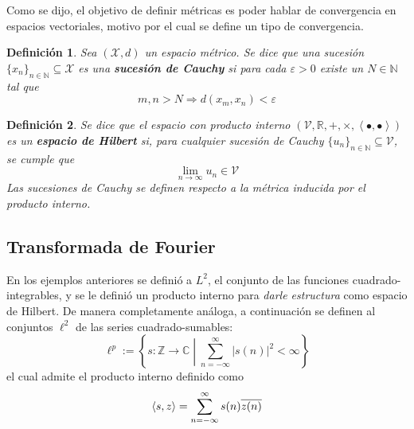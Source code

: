 \documentclass[12pt,letterpaper]{book}
\newtheorem{definicion}{Definición}[chapter]
\newcommand{\R}{\mathbb{R}}
\newcommand{\C}{\mathbb{C}}
\newcommand{\N}{\mathbb{N}}
\newcommand{\Z}{\mathbb{Z}}
\newcommand{\abso}[1]{\left| #1 \right|}
\newcommand{\producto}[1]{\left\langle #1 \right\rangle}
\newcommand{\talque}{\mathrel{}\middle|\mathrel{}}
\begin{document}
Como se dijo, el objetivo de definir métricas es poder hablar de convergencia en espacios vectoriales, motivo por el cual se define un tipo de convergencia.

\begin{definicion}
Sea $(\mathcal{X},d)$ un espacio métrico. Se dice que una sucesión $\{x_n\}_{n\in \N} \subseteq \mathcal{X}$ es una \textbf{sucesión de Cauchy} si para cada $\varepsilon > 0$ existe un $N \in \N$ tal que
\begin{equation}
m, n > N \Rightarrow d(x_m, x_n) < \varepsilon
\end{equation}
\end{definicion}

\begin{definicion}
Se dice que el espacio con producto interno $(\mathcal{V},\R,+,\times, \producto{\bullet,\bullet})$ es un \textbf{espacio de Hilbert} si, para cualquier sucesión de Cauchy $\{u_n\}_{n\in \N} \subseteq \mathcal{V}$, se cumple que
\begin{equation}
\lim_{n\rightarrow\infty} u_n \in \mathcal{V}
\end{equation}
Las sucesiones de Cauchy se definen respecto a la métrica inducida por el producto interno.
\end{definicion}


\subsection{Transformada de Fourier}
\label{sec:fourier1}

En los ejemplos anteriores se definió a $L^{2}$, el conjunto de las funciones cuadrado-integrables, y se le definió un producto interno para \textit{darle estructura} como espacio de Hilbert.
%
De manera completamente análoga, a continuación se definen al conjuntos $\ell^{2}$ de las series cuadrado-sumables:
\begin{equation}
\ell^{p} := \left\{ s: \Z\rightarrow\C \talque \sum_{n=-\infty}^{\infty} \abso{s(n)}^{2} < \infty \right\}
\end{equation}
el cual admite el producto interno definido como
\begin{equation}
\left\langle s,z \right\rangle = \sum_{n=-\infty}^{\infty} s(n) \overline{z(n)}\\
\end{equation}
\end{document}

